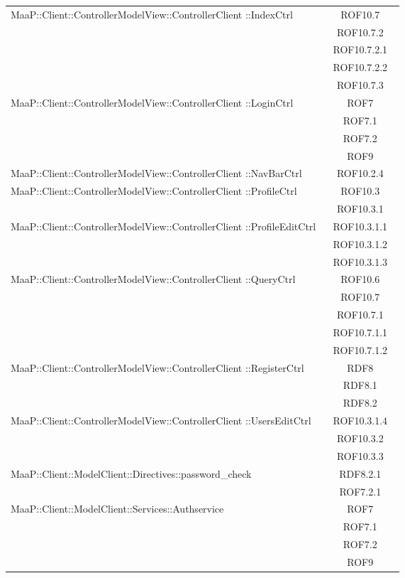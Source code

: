 \begin{center}
\begin{longtable}{|p{0.8\linewidth}|c|}
\midrule
MaaP::Client::ControllerModelView::ControllerClient ::IndexCtrl
& ROF10.7\\
& ROF10.7.2\\
& ROF10.7.2.1\\
& ROF10.7.2.2\\
& ROF10.7.3\\

\midrule
MaaP::Client::ControllerModelView::ControllerClient ::LoginCtrl
& ROF7\\
& ROF7.1\\
& ROF7.2\\
& ROF9\\

\midrule
MaaP::Client::ControllerModelView::ControllerClient ::NavBarCtrl
& ROF10.2.4\\

\midrule
MaaP::Client::ControllerModelView::ControllerClient ::ProfileCtrl
& ROF10.3\\
& ROF10.3.1\\

\midrule
MaaP::Client::ControllerModelView::ControllerClient ::ProfileEditCtrl
& ROF10.3.1.1\\
& ROF10.3.1.2\\
& ROF10.3.1.3\\

\midrule
MaaP::Client::ControllerModelView::ControllerClient ::QueryCtrl
& ROF10.6\\
& ROF10.7\\
& ROF10.7.1\\
& ROF10.7.1.1\\
& ROF10.7.1.2\\

\midrule
MaaP::Client::ControllerModelView::ControllerClient ::RegisterCtrl
& RDF8\\
& RDF8.1\\
& RDF8.2\\

\midrule
MaaP::Client::ControllerModelView::ControllerClient ::UsersEditCtrl
& ROF10.3.1.4\\
& ROF10.3.2\\
& ROF10.3.3\\

\midrule
MaaP::Client::ModelClient::Directives::password\_check
& RDF8.2.1\\
& ROF7.2.1\\

\midrule
MaaP::Client::ModelClient::Services::Authservice
& ROF7\\
& ROF7.1\\
& ROF7.2\\
& ROF9\\


\end{longtable}
\end{center}
